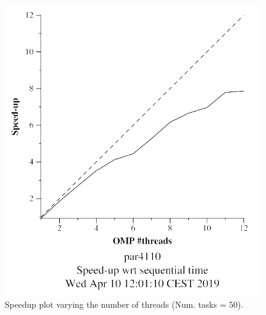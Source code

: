 \documentclass[12pt, a4paper]{article}
\begin{document}
\begin{figure}[H]
\begin{minipage}[b]{0.4\linewidth}
  \includegraphics[scale=0.5]{./mandel-omp-10000-strong-omp-3-50-speedup}
  \caption{Speedup plot varying the number of threads (Num. tasks = 50).}
  \label{fig:mandel-omp-10000-strong-omp-3-50-speedup}
\end{minipage}
\end{figure}
\end{document}
